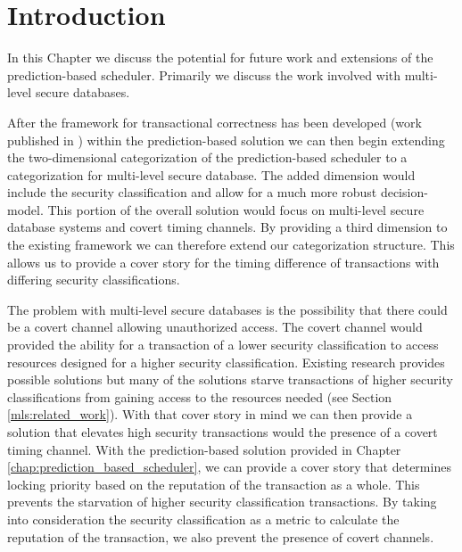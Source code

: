 \section{Introduction}
\label{mls:introduction}

In this Chapter we discuss the potential for future work and extensions of the prediction-based scheduler. Primarily we discuss the work involved with multi-level secure databases.

After the framework for transactional correctness has been developed (work published in \cite{ravan_ensuring_2020}) within the prediction-based solution we can then begin extending the two-dimensional categorization of the prediction-based scheduler to a categorization for multi-level secure database. The added dimension would include the security classification and allow for a much more robust decision-model. This portion of the overall solution would focus on multi-level secure database systems and covert timing channels. By providing a third dimension to the existing framework we can therefore extend our categorization structure. This allows us to provide a cover story for the timing difference of transactions with differing security classifications. 

The problem with multi-level secure databases is the possibility that there could be a covert channel allowing unauthorized access. The covert channel would provided the ability for a transaction of a lower security classification to access resources designed for a higher security classification. Existing research provides possible solutions but many of the solutions starve transactions of higher security classifications from gaining access to the resources needed (see Section \ref{mls:related_work}). With that cover story in mind we can then provide a solution that elevates high security transactions would the presence of a covert timing channel. With the prediction-based solution provided in Chapter \ref{chap:prediction_based_scheduler}, we can provide a cover story that determines locking priority based on the reputation of the transaction as a whole. This prevents the starvation of higher security classification transactions. By taking into consideration the security classification as a metric to calculate the reputation of the transaction, we also prevent the presence of covert channels. 